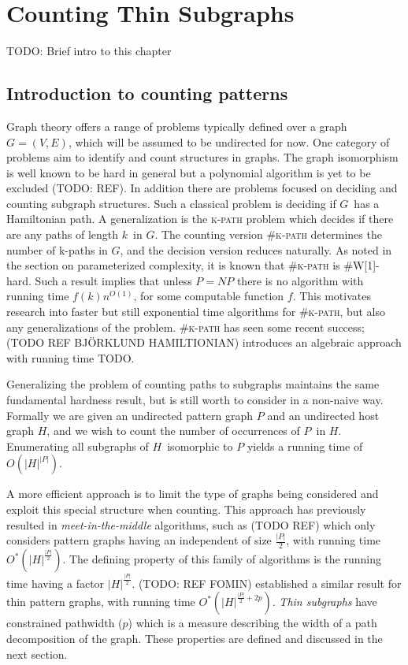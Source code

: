 \documentclass[a4paper,11pt,notitlepage]{report}
\theoremstyle{plain}
\theoremstyle{definition}
\begin{document}
\chapter{Counting Thin Subgraphs}
TODO: Brief intro to this chapter

\section{Introduction to counting patterns}
Graph theory offers a range of problems typically defined over a graph $G = (V, E)$, which will be assumed to be undirected for now.
One category of problems aim to identify and count structures in graphs.
The graph isomorphism is well known to be hard in general but a polynomial algorithm is yet to be excluded (TODO: REF).
In addition there are problems focused on deciding and counting subgraph structures.
Such a classical problem is deciding if $G$ has a Hamiltonian path.
A generalization is the \textsc{k-path} problem which decides if there are any paths of length $k$ in $G$.
The counting version \textsc{\#k-path} determines the number of k-paths in $G$, and the decision version reduces naturally.
As noted in the section on parameterized complexity, it is known that \textsc{\#k-path} is \textsc{\#W[1]}-hard.
Such a result implies that unless $P=NP$ there is no algorithm with running time $f(k)n^{O(1)}$, for some computable function $f$. %
This motivates research into faster but still exponential time algorithms for \textsc{\#k-path}, but also any generalizations of the problem.
\textsc{\#k-path} has seen some recent success; (TODO REF BJÖRKLUND HAMILTIONIAN) introduces an algebraic approach with running time TODO.

Generalizing the problem of counting paths to subgraphs maintains the same fundamental hardness result, but is still worth to consider in a non-naive way.
Formally we are given an undirected pattern graph $P$ and an undirected host graph $H$, and we wish to count the number of occurrences of $P$ in $H$.
Enumerating all subgraphs of $H$ isomorphic to $P$ yields a running time of $O(|H|^{|P|})$.

A more efficient approach is to limit the type of graphs being considered and exploit this special structure when counting.
This approach has previously resulted in \emph{meet-in-the-middle} algorithms, such as (TODO REF) which only considers pattern graphs having an independent of size $\frac{|P|}{2}$,
with running time $O^*(|H|^{\frac{|P|}{2}})$.
The defining property of this family of algorithms is the running time having a factor $|H|^{\frac{|P|}{2}}$.
(TODO: REF FOMIN) established a similar result for thin pattern graphs, with running time $O^*(|H|^{\frac{|P|}{2} + 2p})$.
\emph{Thin subgraphs} have constrained pathwidth ($p$) which is a measure describing the width of a path decomposition of the graph.
These properties are defined and discussed in the next section.
\end{document}
